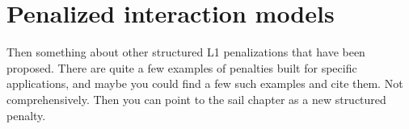 \begin{comment}
\widetilde \bbeta^{(k)} = \boldsymbol{0} \qquad\textrm{if }\Vert U^{(k)}+\gamma_k \widetilde \bbeta^{(k)} \Vert_2 \leq \lambda w_{k}.
\end{align}
By straightforward algebra  we obtain the KKT conditions:
\begin{align*}
-U^{(k)}+\lambda w_{k}\cdot\frac {\widetilde\bbeta^{(k)} }{\Vert\widetilde\bbeta^{(k)}\Vert_2}=\boldsymbol{0}\qquad\textrm{if }\widetilde\bbeta^{(k)}\neq \boldsymbol{0},\\
\left\Vert
U^{(k)}
\right\Vert_2 \le\lambda w_{k}\qquad\textrm{if }\widetilde\bbeta^{(k)}=\boldsymbol{0},
\end{align*}
where $k=1,2,\ldots,K$. Therefore, if the objective function stays unchanged after a cycle, the algorithm necessarily converges to the right
answer.
\end{comment}



\section{Penalized interaction models}



Then something about other structured L1 penalizations that have been proposed. There are quite a few examples of penalties built for specific applications, and maybe you could find a few such examples and cite them. Not comprehensively.  Then you can point to the sail chapter as a new structured penalty.

